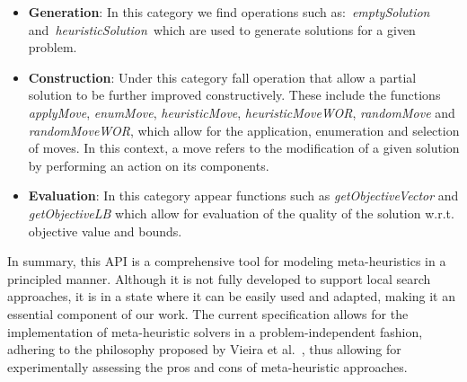 \begin{itemize}
  \item \textbf{Generation}: In this category we find operations such
        as:~\textit{emptySolution} and~\textit{heuristicSolution}~which are used to
        generate solutions for a given problem.
  \item \textbf{Construction}: Under this category fall operation that
        allow a partial solution to be further improved constructively. These include
        the functions \textit{applyMove}, \textit{enumMove}, \textit{heuristicMove},
        \textit{heuristicMoveWOR}, \textit{randomMove} and \textit{randomMoveWOR},
        which allow for the application, enumeration and selection of moves.
        In this context, a move refers to the modification of a given solution by
        performing an action on its components.
  \item \textbf{Evaluation}: In this category appear functions such
        as \textit{getObjectiveVector} and \textit{getObjectiveLB} which allow for
        evaluation of the quality of the solution w.r.t. objective value and bounds.
\end{itemize}

In summary, this API is a comprehensive tool for modeling meta-heuristics in a
principled manner. Although it is not fully developed to support local search
approaches, it is in a state where it can be easily used and adapted, making it
an essential component of our work. The current specification allows
for the implementation of meta-heuristic solvers in a problem-independent
fashion, adhering to the philosophy proposed by Vieira et
al.~\cite{vieira2009uma}, thus allowing for experimentally assessing the pros
and cons of meta-heuristic approaches.
